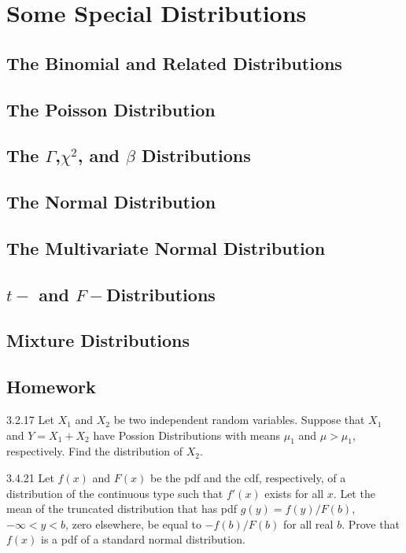 \chapter{Some Special Distributions}

\section{The Binomial and Related Distributions}


\section{The Poisson Distribution}

\section{The $\Gamma$,$\chi^2$, and $\beta$ Distributions}

\section{The Normal Distribution}

\section{The Multivariate Normal Distribution}

\section{$t-$ and $F-$Distributions}

\section{Mixture Distributions}


\section{Homework}

\begin{exercise}{3.2.17}{}
    Let $X_1$ and $X_2$ be two independent random variables.
    Suppose that $X_1$ and $Y=X_1+X_2$ have Possion Distributions
    with means $\mu_1$ and $\mu>\mu_1$, respectively.
    Find the distribution of $X_2$.
\end{exercise}


\begin{exercise}{3.4.21}{}
    Let $f(x)$ and $F(x)$ be the pdf and the cdf, respectively, of a distribution of 
    the continuous type such that $f'(x)$ exists for all $x$. Let the mean of the truncated distribution
    that has pdf $g(y)=f(y)/F(b)$, $-\infty<y<b$, zero elsewhere, be equal to $-f(b)/F(b)$ for all real $b$.
    Prove that $f(x)$ is a pdf of a standard normal distribution.
\end{exercise}


